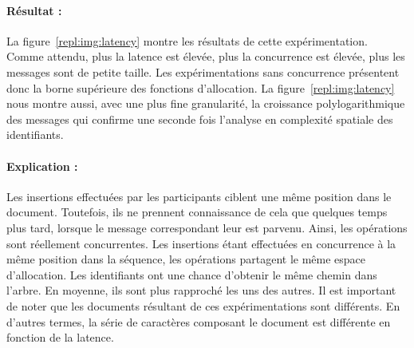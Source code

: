 \paragraph{Résultat :} La figure~\ref{repl:img:latency} montre les résultats de
cette expérimentation. Comme attendu, plus la latence est élevée, plus
la concurrence est élevée, plus les messages sont de petite taille. Les
expérimentations sans concurrence présentent donc la borne supérieure des
fonctions d'allocation. La figure~\ref{repl:img:latency} nous montre aussi, avec
une plus fine granularité, la croissance polylogarithmique des messages qui
confirme une seconde fois l'analyse en complexité spatiale des identifiants.

\paragraph{Explication :} Les insertions effectuées par les participants ciblent
une même position dans le document. Toutefois, ils ne prennent connaissance de
cela que quelques temps plus tard, lorsque le message correspondant leur est
parvenu. Ainsi, les opérations sont réellement concurrentes. Les insertions
étant effectuées en concurrence à la même position dans la séquence, les
opérations partagent le même espace d'allocation. Les identifiants ont une
chance d'obtenir le même chemin dans l'arbre. En moyenne, ils sont plus
rapproché les uns des autres. Il est important de noter que les documents
résultant de ces expérimentations sont différents. En d'autres termes, la série
de caractères composant le document est différente en fonction de la latence.


